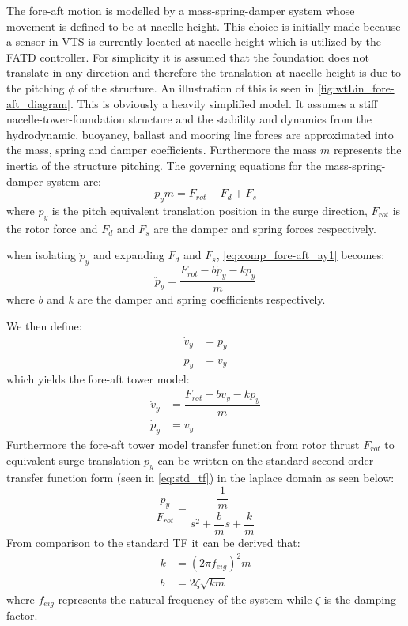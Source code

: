 The fore-aft motion is modelled by a mass-spring-damper system whose movement is defined to be at nacelle height. This choice is initially made because a sensor in VTS is currently located at nacelle height which is utilized by the FATD controller. For simplicity it is assumed that the foundation does not translate in any direction and therefore the translation at nacelle height is due to the pitching $ \phi $ of the structure. An illustration of this is seen in \cref{fig:wtLin_fore-aft_diagram}. This is obviously a heavily simplified model. It assumes a stiff nacelle-tower-foundation structure and the stability and dynamics from the hydrodynamic, buoyancy, ballast and mooring line forces are approximated into the mass, spring and damper coefficients. Furthermore the mass $ m $ represents the inertia of the structure pitching. The governing equations for the mass-spring-damper system are:
\begin{equation}\label{eq:comp_fore-aft_ay1}
	\ddot{p}_y m = F_{rot} - F_d + F_s
\end{equation}
where $ p_y $ is the pitch equivalent translation position in the surge direction, $ F_{rot} $ is the rotor force and $ F_d $ and $ F_s $ are the damper and spring forces respectively.

when isolating $ \ddot{p}_y $ and expanding $ F_d $ and $ F_s $, \cref{eq:comp_fore-aft_ay1} becomes:
\begin{equation}\label{eq:comp_fore-aft_ay2}
	\ddot{p}_y = \dfrac{F_{rot} - b \dot{p}_y - k p_y}{m}
\end{equation}
where $ b $ and $ k $ are the damper and spring coefficients respectively.

We then define:
\begin{align}
	\dot{v}_y & = \ddot{p}_y \label{eq:comp_fore-aft_ay} \\
	\dot{p}_y & = v_y \label{eq:comp_fore-aft_vy}
\end{align}
which yields the fore-aft tower model:
\begin{align}
	\dot{v}_y & = \dfrac{F_{rot} - b v_y - k p_y}{m}  \label{eq:comp_fore-aft_1} \\
	\dot{p}_y & = v_y \label{eq:comp_fore-aft_2}
\end{align}
Furthermore the fore-aft tower model transfer function from rotor thrust $ F_{rot} $ to equivalent surge translation $ p_y $ can be written on the standard second order transfer function form (seen in \cref{eq:std_tf}) in the laplace domain as seen below:
\begin{equation}\label{eq:comp_fore_aft_tf}
	\dfrac{p_y}{F_{rot}} = \dfrac{\dfrac{1}{m}}{s^2 + \dfrac{b}{m} s + \dfrac{k}{m}}
\end{equation}
From comparison to the standard TF it can be derived that:
\begin{align}
	k & = (2 \pi f_{eig})^2 m \label{eq:comp_fore_aft_tf_k} \\
	b & = 2 \zeta \sqrt{k m} \label{eq:comp_fore_aft_tf_b}
\end{align}
where $ f_{eig} $ represents the natural frequency of the system while $ \zeta $ is the damping factor. 

